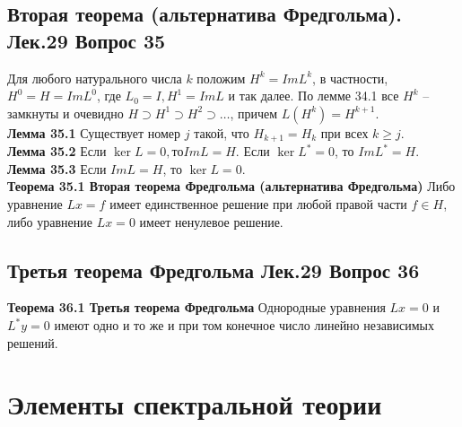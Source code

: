 \documentclass{article}
\begin{document}
\subsection{Вторая теорема (альтернатива Фредгольма). Лек.29 \textbf{Вопрос 35}}
	Для любого натурального числа $k$ положим ${H}^{k}=Im{L}^{k}$, в частности, ${H}^{0}=H=Im{L}^{0}$, где ${L}_{0}=I,{H}^{1}=ImL$ и так далее. По лемме 34.1 все ${H}^{k}$ – замкнуты и очевидно $H\supset {H}^{1}\supset {H}^{2}\supset \ldots$, причем $L({H}^{k})={H}^{k+1}$.\\
	\textbf{Лемма 35.1} Существует номер $j$ такой, что ${H}_{k+1}={H}_{k}$ при всех $k\ge j$.\\
	\textbf{Лемма 35.2} Если $\ker L=0, то ImL=H$. Если $\ker {L}^{*}=0$, то $Im{L}^{*}=H$.\\
	\textbf{Лемма 35.3} Если $ImL=H$, то $\ker L=0$.\\
	\textbf{Теорема 35.1 Вторая теорема Фредгольма (альтернатива Фредгольма)} Либо уравнение $Lx=f$ имеет единственное решение при любой правой части $f\in H$, либо уравнение $Lx=0$ имеет ненулевое решение.\\
\subsection{Третья теорема Фредгольма Лек.29 \textbf{Вопрос 36}}
	\textbf{Теорема 36.1 Третья теорема Фредгольма} Однородные уравнения $Lx=0$ и ${L}^{*}y=0$ имеют одно и то же и при том конечное число линейно независимых решений.\\
\section{Элементы спектральной теории}
\end{document}
